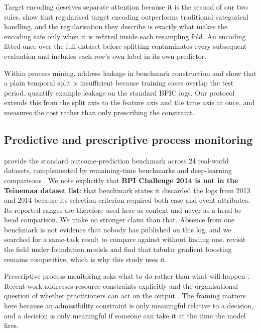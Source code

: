 Target encoding deserves separate attention because it is the second of our two rules.
\citet{pargent2022regularized} show that regularised target encoding outperforms traditional
categorical handling, and the regularisation they describe is exactly what makes the encoding
safe only when it is refitted inside each resampling fold. An encoding fitted once over the
full dataset before splitting contaminates every subsequent evaluation and includes each
row's own label in its own predictor.

Within process mining, \citet{weytjens2022creating} address leakage in benchmark
construction and show that a plain temporal split is insufficient because training cases
overlap the test period. \citet{abb2024discussion} quantify example leakage on the standard
BPIC logs. Our protocol extends this from the split axis to the feature axis and the time
axis at once, and measures the cost rather than only prescribing the constraint.

\subsection{Predictive and prescriptive process monitoring}

\citet{teinemaa2019outcome} provide the standard outcome-prediction benchmark across 24
real-world datasets, complemented by remaining-time benchmarks \citep{verenich2019survey} and
deep-learning comparisons \citep{ramamaneiro2023learning,kratsch2021machine}. We note
explicitly that \textbf{BPI Challenge 2014 is not in the Teinemaa dataset list}: that
benchmark states it discarded the logs from 2013 and 2014 because its selection criterion
required both case and event attributes. Its reported ranges are therefore used here as
context and never as a head-to-head comparison. We make no stronger claim than that. Absence
from one benchmark is not evidence that nobody has published on this log, and we searched for
a same-task result to compare against without finding one. \citet{fertig2026revisiting} revisit the field under foundation models and find
that tabular gradient boosting remains competitive, which is why this study uses it.

Prescriptive process monitoring asks what to do rather than what will happen
\citep{kubrak2022prescriptive}. Recent work addresses resource constraints explicitly
\citep{shoush2025prescriptive} and the organisational question of whether practitioners can
act on the output \citep{kubrak2026supporting}. The framing matters here because an
admissibility constraint is only meaningful relative to a decision, and a decision is only
meaningful if someone can take it at the time the model fires.

